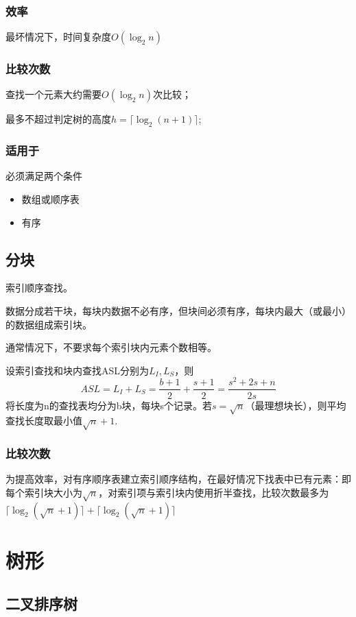 \subsubsection{效率}
最坏情况下，时间复杂度\(O(\log_2n)\)


\subsubsection{比较次数}
查找一个元素大约需要\(O(\log_2n)\)次比较；

最多不超过判定树的高度\(h = \lceil\log_2(n + 1)\rceil\);


\subsubsection{适用于}
必须满足两个条件
\begin{itemize}
    \item 数组或顺序表
    \item 有序
\end{itemize}


\subsection{分块}
索引顺序查找。

数据分成若干块，每块内数据不必有序，但块间必须有序，每块内最大（或最小）的数据组成索引块。

通常情况下，不要求每个索引块内元素个数相等。



设索引查找和块内查找ASL分别为\(L_I, L_S\)，则
\[ASL = L_I + L_S = \dfrac{b + 1}{2} + \dfrac{s + 1}{2} = \dfrac{s^2 + 2s + n}{2s}\]
将长度为n的查找表均分为b块，每块s个记录。若\(s = \sqrt{n}\)（最理想块长），则平均查找长度取最小值\(\sqrt{n} + 1\).


\subsubsection{比较次数}
为提高效率，对有序顺序表建立索引顺序结构，在最好情况下找表中已有元素：即每个索引块大小为\(\sqrt{n}\)，对索引项与索引块内使用折半查找，比较次数最多为\(\lceil\log_2(\sqrt{n} + 1)\rceil + \lceil\log_2(\sqrt{n} + 1)\rceil\)


\section{树形}

\subsection{二叉排序树}\label{二叉排序树}

